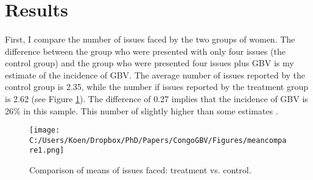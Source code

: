 \documentclass[11pt,a4paper]{scrartcl} %
\begin{document}












\section*{Results}

%	
%



\paragraph{}
First, I compare the number of issues faced by the two groups of women. The difference between the group who were presented with only four issues (the control group) and the group who were presented four issues plus GBV is my estimate of the incidence of GBV. The average number of issues reported by the control group is 2.35, while the number if issues reported by the treatment group is 2.62 (see Figure \ref{fig:meancompare1}). The difference of 0.27 implies that the incidence of GBV is 26\% in this sample. This number of slightly higher than some estimates \citep{Quattrochi2019}.

\begin{figure}
  \texttt{[image: C:/Users/Koen/Dropbox/PhD/Papers/CongoGBV/Figures/meancompare1.png]}
  \caption{Comparison of means of issues faced: treatment vs. control.}
  \label{fig:meancompare1}
\end{figure}
\end{document}
